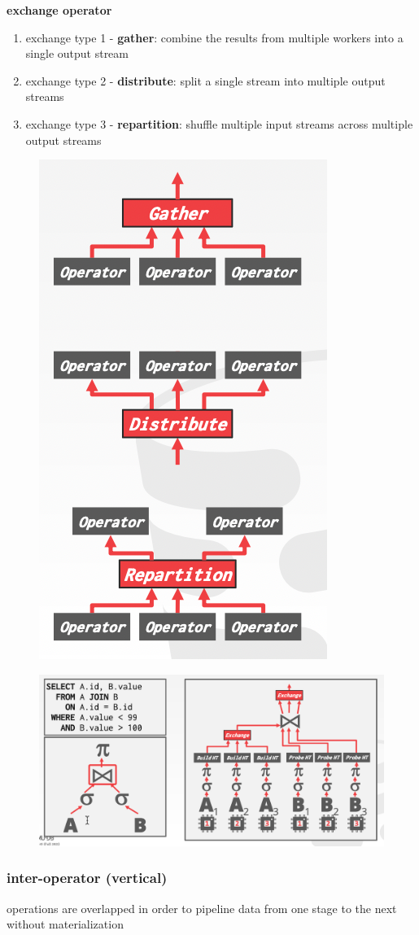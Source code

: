 \documentclass[11pt]{article}
\begin{document}
\textbf{exchange operator}
\begin{enumerate}
\item exchange type 1 - \textbf{gather}: combine the results from multiple workers into a single output stream
\item exchange type 2 - \textbf{distribute}: split a single stream into multiple output streams
\item exchange type 3 - \textbf{repartition}: shuffle multiple input streams across multiple output streams
\end{enumerate}

\begin{figure}[htbp]
\centering
\includegraphics[width=.4\textwidth]{../images/15445/32.png}
\label{}
\end{figure}

\begin{figure}[htbp]
\centering
\includegraphics[width=.7\textwidth]{../images/15445/33.png}
\label{}
\end{figure}
\subsubsection{inter-operator (vertical)}
\label{sec:org6a7732a}
operations are overlapped in order to pipeline data from one stage to the next without
materialization
\end{document}
